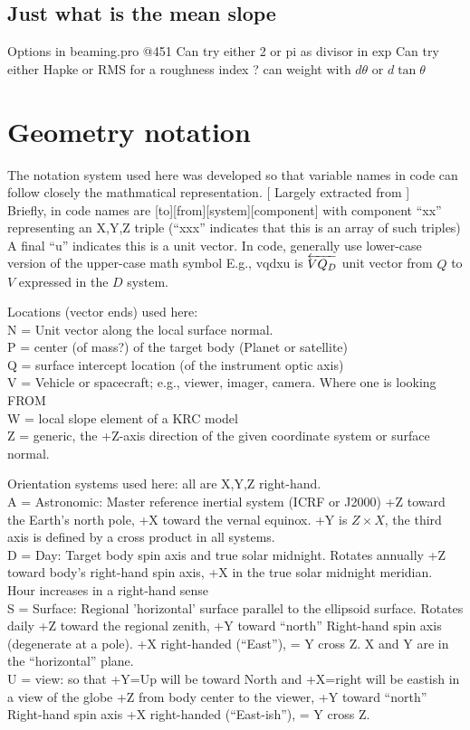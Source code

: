 \documentclass{article}
\begin{document}
\subsection{Just what is the mean slope}
Options in beaming.pro @451
\qi Can try either 2 or pi as divisor in exp
\qi Can try either Hapke or RMS for a roughness index
\qi ? can weight with $d \theta$ or  $d \tan \theta$

\section{Geometry notation \label{geom}}

 The notation system used here was developed so that variable names in code can
 follow closely the mathmatical representation.  [ Largely extracted from  ]  
\\ Briefly, in code names are [to][from][system][component] with component ``xx'' representing an X,Y,Z triple (``xxx'' indicates that this is an array of such triples)
\qi A final ``u'' indicates this is a unit vector. 
\qi In code, generally use lower-case version of the upper-case math symbol
\qi E.g., vqdxu is $\overleftarrow{VQ_D}$ unit vector from $Q$ to $V$ expressed in the $D$ system.

\vspace{2.mm}
Locations (vector ends) used here:
\\ N = Unit vector along the local surface normal.
\\ P = center (of mass?) of the target body (Planet or satellite)
\\ Q = surface intercept location (of the instrument optic axis)
\\ V = Vehicle or spacecraft; e.g., viewer, imager, camera. Where one is looking FROM
\\ W = local slope element of a KRC model
\\ Z = generic, the +Z-axis direction of the given coordinate system or surface normal.
 
\vspace{2.mm}
Orientation systems used here: all are X,Y,Z right-hand. 
\\ A = Astronomic: Master reference inertial system (ICRF or J2000) 
\qi  +Z toward the Earth's north pole, +X toward the vernal equinox.
\qii +Y is $Z \times  X $, the third axis is defined by a cross product in all systems. 
\\ D = Day: Target body spin axis and true solar midnight. Rotates annually
\qi +Z toward body's right-hand spin axis, +X in the true solar midnight meridian.
\qii Hour increases in a right-hand sense
\\ S = Surface: Regional 'horizontal' surface parallel to the ellipsoid surface. Rotates daily
\qi  +Z toward the regional zenith, +Y toward ``north'' Right-hand spin axis (degenerate at a pole).
\qii  +X right-handed (``East''), = Y cross Z. X and Y are in the ``horizontal'' plane.
\\ U = view: so that +Y=Up will be toward North and  +X=right will be eastish in a view of the globe
\qi +Z from body center to the viewer, +Y toward ``north'' Right-hand spin axis
\qi +X right-handed (``East-ish''), = Y cross Z.
\end{document}
